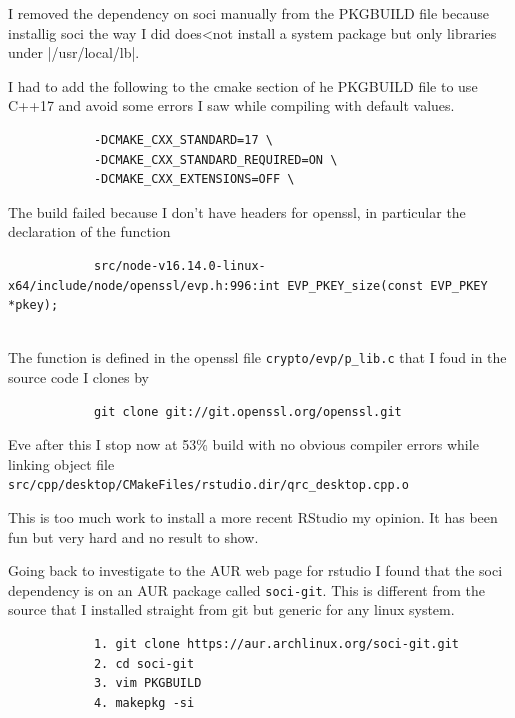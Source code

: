 \documentclass[]{scrartcl}
\begin{document}
	I removed the dependency on soci manually from the PKGBUILD file because installig soci the way I did does<not install a system package but only libraries under |/usr/local/lb|.
	
	I had to add the following to the cmake section of he PKGBUILD file to use C++17 and avoid some errors I saw while compiling with default values.
	
	\begin{tiny}
		\begin{verbatim}
			-DCMAKE_CXX_STANDARD=17 \
			-DCMAKE_CXX_STANDARD_REQUIRED=ON \
			-DCMAKE_CXX_EXTENSIONS=OFF \
		\end{verbatim}
	\end{tiny}
	
	The build failed because I don't have headers for openssl, in particular the declaration of the function
	
	\begin{tiny}
		\begin{verbatim}
			src/node-v16.14.0-linux-x64/include/node/openssl/evp.h:996:int EVP_PKEY_size(const EVP_PKEY *pkey);
			
		\end{verbatim}
	\end{tiny}
	
	The function is defined in the openssl file \verb|crypto/evp/p_lib.c| that I foud in the source code I clones by
	
	\begin{small}
		\begin{verbatim}
			git clone git://git.openssl.org/openssl.git
		\end{verbatim}
	\end{small}
	
	Eve after this I stop now at 53\% build with no obvious compiler errors while linking object file \verb|src/cpp/desktop/CMakeFiles/rstudio.dir/qrc_desktop.cpp.o|
	
	This is too much work to install a more recent RStudio  my opinion. It has been fun but very hard and no result to show.
	
	
	Going back to investigate to the AUR web page for rstudio I found that the soci dependency is on an AUR package called \texttt{soci-git}. 
	This is different from the source that I installed straight from git but generic for any linux system.
	
	\begin{scriptsize}
		\begin{verbatim}
			1. git clone https://aur.archlinux.org/soci-git.git
			2. cd soci-git
			3. vim PKGBUILD
			4. makepkg -si
			
		\end{verbatim}
	\end{scriptsize}
\end{document}
